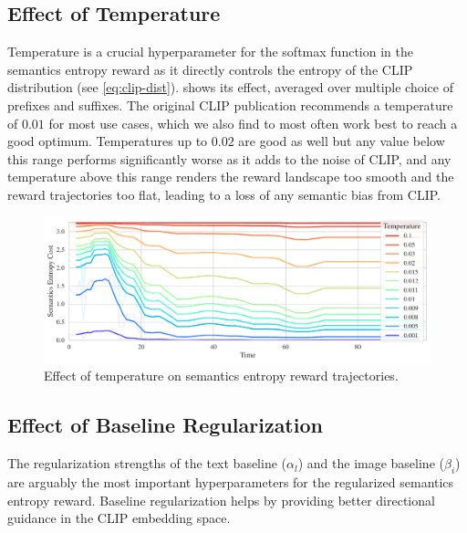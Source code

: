 \subsection{Effect of Temperature}
\label{sec:reg-temperature}

Temperature is a crucial hyperparameter for the softmax function in the semantics entropy reward as it directly controls the entropy of the CLIP distribution (see \eqref{eq:clip-dist}).
 shows its effect, averaged over multiple choice of prefixes and suffixes.
The original CLIP publication recommends a temperature of \(0.01\) for most use cases, which we also find to most often work best to reach a good optimum.
Temperatures up to \(0.02\) are good as well but any value below this range performs significantly worse as it adds to the noise of CLIP, and any temperature above this range renders the reward landscape too smooth and the reward trajectories too flat, leading to a loss of any semantic bias from CLIP.

\begin{figure}[H]
    \centering
    \includegraphics[width=\textwidth]{images/temperature_comparison.pdf}
    \caption{Effect of temperature on semantics entropy reward trajectories.}
    \label{fig:clip-temperature}    
\end{figure}

\subsection{Effect of Baseline Regularization}
\label{sec:reg-alpha-beta}

The regularization strengths of the text baseline (\(\alpha_{l}\)) and the image baseline (\(\beta_{i}\)) are arguably the most important hyperparameters for the regularized semantics entropy reward.
Baseline regularization helps by providing better directional guidance in the CLIP embedding space.

